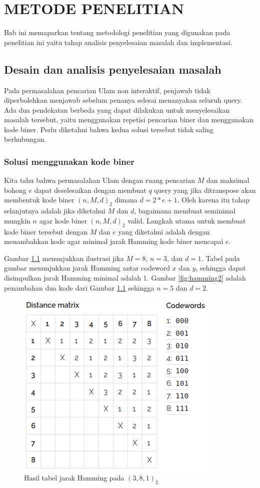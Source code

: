\chapter{METODE PENELITIAN}

Bab ini memaparkan tentang metodologi penelitian yang digunakan pada penelitian ini yaitu tahap analisis penyelesaian masalah dan implementasi.

\section{Desain dan analisis penyelesaian masalah}

Pada permasalahan pencarian Ulam non interaktif, penjawab tidak diperbolehkan menjawab sebelum penanya selesai menanyakan seluruh query. Ada dua pendekatan berbeda yang dapat dilakukan untuk menyelesaikan masalah tersebut, yaitu menggunakan repetisi pencarian biner dan menggunakan kode biner. Perlu diketahui bahwa kedua solusi tersebut tidak saling berhubungan.

\subsection{Solusi menggunakan kode biner}

Kita tahu bahwa permasalahan Ulam dengan ruang pencarian $M$ dan maksimal bohong $e$ dapat deselesaikan dengan membuat $q$ query yang jika ditranspose akan membentuk kode biner $(n,M,d)_2$ dimana $d = 2*e+1$. Oleh karena itu tahap selanjutnya adalah jika diketahui $M$ dan $d$, bagaimana membuat seminimal mungkin $n$ agar kode biner $(n,M,d)_2$ valid. Langkah utama untuk membuat kode biner tersebut dengan $M$ dan $e$ yang diketahui adalah dengan menambahkan kode agar minimal jarak Hamming kode biner mencapai $e$.

Gambar \ref{fig:hamming1} menunjukkan ilustrasi jika $M = 8$, $n = 3$, dan $d = 1$. Tabel pada gambar  menunjukkan jarak Hamming antar codeword $x$ dan $y$, sehingga dapat disimpulkan jarak Hamming minimal adalah 1. Gambar \ref{fig:hamming2} adalah penambahan dua kode dari Gambar \ref{fig:hamming1} sehingga $n = 5$ dan $d = 2$.

\begin{figure}
\centering
\includegraphics[scale=0.7]{../img/hamming1.png}
\caption{Hasil tabel jarak Hamming pada $(3,8,1)_2$}
\label{fig:hamming1}
\end{figure}

